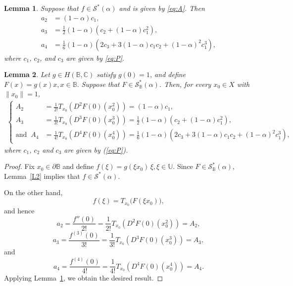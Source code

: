 \documentclass[11pt, reqno]{amsart}
\newtheorem{lem}{Lemma}[section]
\numberwithin{equation}{section}
\newcommand{\bea}{\begin{eqnarray}}
\newcommand{\eea}{\end{eqnarray}}
\begin{document}
\begin{lem}\label{L3}\cite[Theorem 2.1]{CKKLS2018}
Suppose that $f\in \mathcal{S}^{*}(\alpha)$ and is given by \eqref{eq:A}. Then
\begin{equation}\label{eq:coefficients}
\begin{aligned}
a_2 &=(1-\alpha)c_1,\\[2mm]
a_3 &= \frac{1}{2}(1-\alpha)\left(c_2+(1-\alpha)c_1^2\right),\\[2mm]
a_4 &= \frac{1}{6}(1-\alpha)\left(2c_3+3(1-\alpha)c_1c_2+(1-\alpha)^2c_1^3\right),
\end{aligned}
\end{equation}
where $c_1$, $c_2$, and $c_3$ are given by \eqref{eq:P}.
\end{lem}
\begin{lem}\label{L4}  Let $g\in H(\mathbb{B},\mathbb{C})$ satisfy $g(0)=1$, and define $F(x)=g(x)x, x\in\mathbb{B}.$ Suppose that $F\in\mathcal{S}_{\mathbb{B}}^{*}(\alpha)$. Then, for every
$x_{0}\in X$ with $\|x_{0}\|=1$,
\bea\label{A234}
\begin{cases} A_{2}
&=
\frac{1}{2!}
T_{x_{0}}
\left(
D^{2}F(0)(x_{0}^{2})
\right)
=(1-\alpha)c_1,\\
A_{3}
&=
\frac{1}{3!}
T_{x_{0}}
\left(
D^{3}F(0)(x_{0}^{3})
\right)
=\frac{1}{2}(1-\alpha)\left(c_2+(1-\alpha)c_1^2\right),
\\
\text{and}\;\; 
A_{4}
&=
\frac{1}{4!}T_{x_{0}}\left(D^{4}F(0)(x_{0}^{4})\right)=\frac{1}{6}(1-\alpha)\left(2c_3+3(1-\alpha)c_1c_2+(1-\alpha)^2c_1^3\right),
\end{cases}
\eea
where $c_1$, $c_2$ and $c_3$ are given by (\ref{eq:P}).

\end{lem}
\begin{proof}
Fix $x_{0}\in\partial\mathbb{B}$ and define $f(\xi)=g(\xi x_{0})\,\xi, \xi\in\mathbb{U}.$
Since $F\in\mathcal{S}_{\mathbb{B}}^{*}(\alpha)$, Lemma~\ref{L2}
implies that $f\in \mathcal{S}^*(\alpha).$

On the other hand,
\[
f(\xi)
=
T_{x_{0}}\bigl(F(\xi x_{0})\bigr),
\]
and hence
\[
a_{2}
=
\frac{f''(0)}{2!}
=
\frac{1}{2!}
T_{x_{0}}
\left(
D^{2}F(0)(x_{0}^{2})
\right)
=
A_{2},
\]
\[
a_{3}
=
\frac{f^{(3)}(0)}{3!}
=
\frac{1}{3!}
T_{x_{0}}
\left(
D^{3}F(0)(x_{0}^{3})
\right)
=
A_{3},
\]
and \[
a_{4}
=
\frac{f^{(4)}(0)}{4!}
=
\frac{1}{4!}
T_{x_{0}}
\left(
D^{4}F(0)(x_{0}^{4})
\right)
=
A_{4}.
\]
Applying Lemma~\ref{L3}, we obtain the desired result.
\end{proof}
\end{document}
